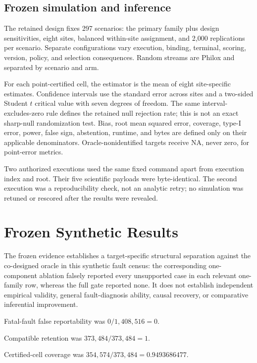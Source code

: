 \documentclass{article}
\begin{document}
\subsection{Frozen simulation and inference}

The retained design fixes 297 scenarios: the primary family plus design sensitivities, eight sites, balanced within-site assignment, and 2,000 replications per scenario. Separate configurations vary execution, binding, terminal, scoring, version, policy, and selection consequences. Random streams are Philox and separated by scenario and arm.

For each point-certified cell, the estimator is the mean of eight site-specific estimates. Confidence intervals use the standard error across sites and a two-sided Student $t$ critical value with seven degrees of freedom. The same interval-excludes-zero rule defines the retained null rejection rate; this is not an exact sharp-null randomization test. Bias, root mean squared error, coverage, type-I error, power, false sign, abstention, runtime, and bytes are defined only on their applicable denominators. Oracle-nonidentified targets receive \textsc{NA}, never zero, for point-error metrics.

Two authorized executions used the same fixed command apart from execution index and root. Their five scientific payloads were byte-identical. The second execution was a reproducibility check, not an analytic retry; no simulation was retuned or rescored after the results were revealed.

\section{Frozen Synthetic Results}
\label{sec:results}

The frozen evidence establishes a target-specific structural separation against the co-designed oracle in this synthetic fault census: the corresponding one-component ablation falsely reported every unsupported case in each relevant one-family row, whereas the full gate reported none. It does not establish independent empirical validity, general fault-diagnosis ability, causal recovery, or comparative inferential improvement.

Fatal-fault false reportability was $0/1{,}408{,}516=0$.

Compatible retention was $373{,}484/373{,}484=1$.

Certified-cell coverage was $354{,}574/373{,}484=0.9493686477$.
\end{document}

